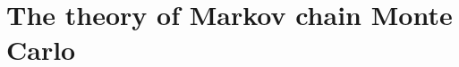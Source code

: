 \documentclass [12pt,letter]{article}
\theoremstyle{plain}
\theoremstyle{plain}
\theoremstyle{definition}
\theoremstyle{definition}
\numberwithin{equation}{section}
\begin{document}
\section{The theory of Markov chain Monte Carlo}
\label{sec:mcmc}

%
%
% 
%
%
%
%
% 
\end{document}
